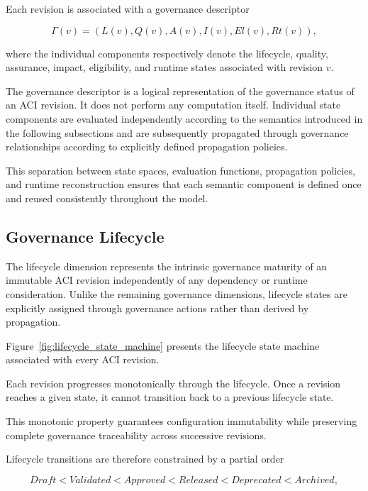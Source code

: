 \documentclass[10pt]{article}
\begin{document}
Each revision is associated with a governance descriptor

\begin{equation}
	\Gamma(v)=
	\left(
	L(v),
	Q(v),
	A(v),
	I(v),
	El(v),
	Rt(v)
	\right),
	\label{eq:governance_descriptor}
\end{equation}

where the individual components respectively denote the lifecycle, quality, assurance, impact, eligibility, and runtime states associated with revision $v$.

The governance descriptor is a logical representation of the governance status of an ACI revision. It does not perform any computation itself. Individual state components are evaluated independently according to the semantics introduced in the following subsections and are subsequently propagated through governance relationships according to explicitly defined propagation policies.

This separation between state spaces, evaluation functions, propagation policies, and runtime reconstruction ensures that each semantic component is defined once and reused consistently throughout the model.

\subsection{Governance Lifecycle}
\label{sec:lifecycle_semantics}

The lifecycle dimension represents the intrinsic governance maturity of an immutable ACI revision independently of any dependency or runtime consideration. Unlike the remaining governance dimensions, lifecycle states are explicitly assigned through governance actions rather than derived by propagation.

Figure~\ref{fig:lifecycle_state_machine} presents the lifecycle state machine associated with every ACI revision.

Each revision progresses monotonically through the lifecycle. Once a revision reaches a given state, it cannot transition back to a previous lifecycle state.

This monotonic property guarantees configuration immutability while preserving complete governance traceability across successive revisions.

Lifecycle transitions are therefore constrained by a partial order

\begin{equation}
	Draft
	<
	Validated
	<
	Approved
	<
	Released
	<
	Deprecated
	<
	Archived,
	\label{eq:lifecycle_order}
\end{equation}
\end{document}
